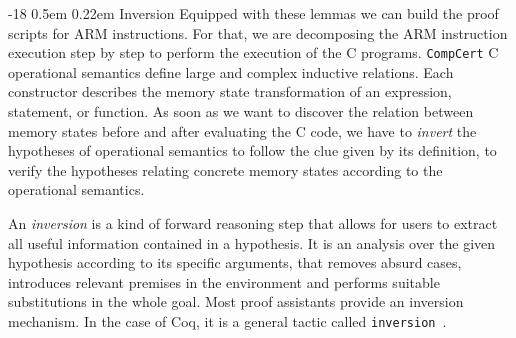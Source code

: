 \documentclass{llncs}
\makeatletter
\newcommand{\coqdockw}[1]{\texttt{#1}}
\newcommand{\inversion}{\coqdockw{inversion}\xspace}
\newcommand{\compcert}{\texttt{CompCert}\xspace}
\renewcommand\subsubsection{\@startsection{subsubsection}{3}{\z@}%
                       {-18\p@ \@plus -4\p@ \@minus -4\p@}%
                       {0.5em \@plus 0.22em}%
                       {\normalfont\normalsize\bfseries\boldmath}}
\makeatother
\begin{document}
\subsubsection{Inversion}
Equipped with these lemmas we can build the proof scripts for ARM
instructions.  For that, we are decomposing the ARM instruction
execution step by step to perform the execution of the C programs.
\compcert C operational semantics define large and complex inductive
relations. Each constructor describes the memory state transformation
of an expression, statement, or function.  As soon as we want to
discover the relation between memory states before and after
evaluating the C code, we have to \emph{invert} the hypotheses of operational
semantics to follow the clue given by its definition, to verify the
hypotheses relating concrete memory states according to the
operational semantics.

An \emph{inversion} is a kind of forward reasoning
step that allows for users to extract all useful information contained
in a hypothesis.  It is an analysis over the given hypothesis according
to its specific arguments, that removes absurd cases, introduces
relevant premises in the environment and performs suitable
substitutions in the whole goal.
Most proof assistants provide an inversion mechanism.
In the case of Coq, it is
a general tactic called
\inversion~\cite{coqmanual}.
\end{document}
